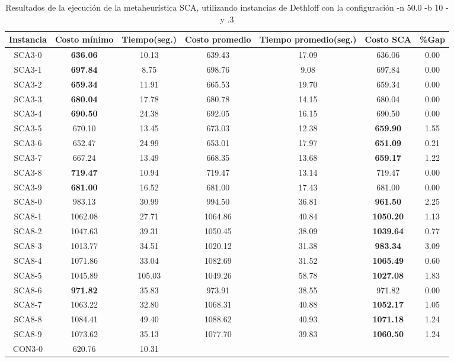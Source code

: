 \begin{table}[ht]
\caption{Resultados de la ejecución de la metaheurística SCA, utilizando instancias de Dethloff con la configuración -n 50.0 -b 10 -y .3}
\centering
\small
\begin{tabular}{c c c c c c c}
\hline\hline
Instancia & Costo mínimo & Tiempo(seg.) & Costo promedio & Tiempo promedio(seg.) & Costo SCA & \%Gap \\ [0.5ex]
\hline
SCA3-0 & \bf{636.06} & 10.13 & 
639.43 & 17.09 & 636.06 & 0.00\\
SCA3-1 & \bf{697.84} & 8.75 & 
698.76 & 9.08 & 697.84 & 0.00\\
SCA3-2 & \bf{659.34} & 11.91 & 
665.53 & 19.70 & 659.34 & 0.00\\
SCA3-3 & \bf{680.04} & 17.78 & 
680.78 & 14.15 & 680.04 & 0.00\\
SCA3-4 & \bf{690.50} & 24.38 & 
692.05 & 16.15 & 690.50 & 0.00\\
SCA3-5 & 670.10 & 13.45 & 
673.03 & 12.38 & \bf{659.90} & 
1.55\\SCA3-6 & 652.47 & 24.99 & 
653.01 & 17.97 & \bf{651.09} & 
0.21\\SCA3-7 & 667.24 & 13.49 & 
668.35 & 13.68 & \bf{659.17} & 
1.22\\SCA3-8 & \bf{719.47} & 10.94 & 
719.47 & 13.14 & 719.47 & 0.00\\
SCA3-9 & \bf{681.00} & 16.52 & 
681.00 & 17.43 & 681.00 & 0.00\\
SCA8-0 & 983.13 & 30.99 & 
994.50 & 36.81 & \bf{961.50} & 
2.25\\SCA8-1 & 1062.08 & 27.71 & 
1064.86 & 40.84 & \bf{1050.20} & 
1.13\\SCA8-2 & 1047.63 & 39.31 & 
1050.45 & 38.09 & \bf{1039.64} & 
0.77\\SCA8-3 & 1013.77 & 34.51 & 
1020.12 & 31.38 & \bf{983.34} & 
3.09\\SCA8-4 & 1071.86 & 33.04 & 
1082.69 & 31.52 & \bf{1065.49} & 
0.60\\SCA8-5 & 1045.89 & 105.03 & 
1049.26 & 58.78 & \bf{1027.08} & 
1.83\\SCA8-6 & \bf{971.82} & 35.83 & 
973.91 & 38.55 & 971.82 & 0.00\\
SCA8-7 & 1063.22 & 32.80 & 
1068.31 & 40.88 & \bf{1052.17} & 
1.05\\SCA8-8 & 1084.41 & 49.40 & 
1088.62 & 40.93 & \bf{1071.18} & 
1.24\\SCA8-9 & 1073.62 & 35.13 & 
1077.70 & 39.83 & \bf{1060.50} & 
1.24\\CON3-0 & 620.76 & 10.31 & 

\end{tabular}
\end{table}
